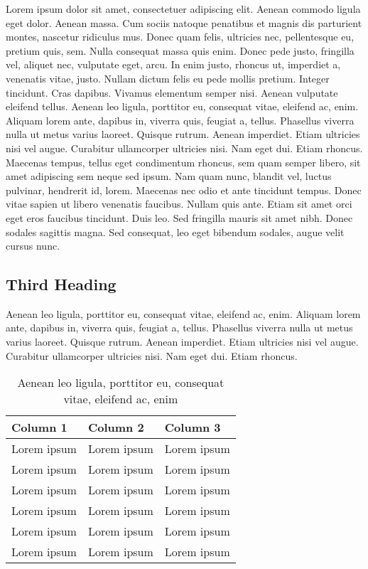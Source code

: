\documentclass[11pt,a4paper]{scrreprt}
\begin{document}
Lorem ipsum dolor sit amet, consectetuer adipiscing elit. Aenean commodo ligula eget dolor. Aenean massa. Cum sociis natoque penatibus et magnis dis parturient montes, nascetur ridiculus mus. Donec quam felis, ultricies nec, pellentesque eu, pretium quis, sem. Nulla consequat massa quis enim. Donec pede justo, fringilla vel, aliquet nec, vulputate eget, arcu. In enim justo, rhoncus ut, imperdiet a, venenatis vitae, justo. Nullam dictum felis eu pede mollis pretium. Integer tincidunt. Cras dapibus. Vivamus elementum semper nisi. Aenean vulputate eleifend tellus. Aenean leo ligula, porttitor eu, consequat vitae, eleifend ac, enim. Aliquam lorem ante, dapibus in, viverra quis, feugiat a, tellus. Phasellus viverra nulla ut metus varius laoreet. Quisque rutrum. Aenean imperdiet. Etiam ultricies nisi vel augue. Curabitur ullamcorper ultricies nisi. Nam eget dui. Etiam rhoncus. Maecenas tempus, tellus eget condimentum rhoncus, sem quam semper libero, sit amet adipiscing sem neque sed ipsum. Nam quam nunc, blandit vel, luctus pulvinar, hendrerit id, lorem. Maecenas nec odio et ante tincidunt tempus. Donec vitae sapien ut libero venenatis faucibus. Nullam quis ante. Etiam sit amet orci eget eros faucibus tincidunt. Duis leo. Sed fringilla mauris sit amet nibh. Donec sodales sagittis magna. Sed consequat, leo eget bibendum sodales, augue velit cursus nunc.

\subsection{Third Heading}

Aenean leo ligula, porttitor eu, consequat vitae, eleifend ac, enim. Aliquam lorem ante, dapibus in, viverra quis, feugiat a, tellus. Phasellus viverra nulla ut metus varius laoreet. Quisque rutrum. Aenean imperdiet. Etiam ultricies nisi vel augue. Curabitur ullamcorper ultricies nisi. Nam eget dui. Etiam rhoncus.

\begin{table}[!h]
    \centering
    \begin{tabular}{lll} 
        \toprule
        \textbf{Column 1} & \textbf{Column 2} & \textbf{Column 3} \\
        \midrule
        Lorem ipsum & Lorem ipsum & Lorem ipsum \\
        Lorem ipsum & Lorem ipsum & Lorem ipsum \\
        Lorem ipsum & Lorem ipsum & Lorem ipsum \\
        Lorem ipsum & Lorem ipsum & Lorem ipsum \\
        Lorem ipsum & Lorem ipsum & Lorem ipsum \\
        Lorem ipsum & Lorem ipsum & Lorem ipsum \\
        \bottomrule
    \end{tabular}
    \caption{Aenean leo ligula, porttitor eu, consequat vitae, eleifend ac, enim}
    \label{table:table-lable}
\end{table}
\noindent
\end{document}
